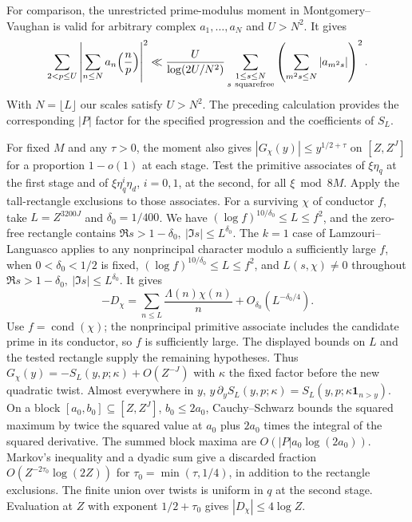 For comparison, the unrestricted prime-modulus moment in
Montgomery--Vaughan is valid for arbitrary complex
\(a_1,\ldots,a_N\) and \(U>N^2\). It gives
\[
 \sum_{2<p\le U}\left|\sum_{n\le N}a_n\Bigl(\frac np\Bigr)\right|^2
 \ll\frac{U}{\log(2U/N^2)}
      \sum_{\substack{1\le s\le N\\s\ {\rm squarefree}}}
     \left(\sum_{m^2s\le N}|a_{m^2s}|\right)^2.
\]
With \(N=\lfloor L\rfloor\) our scales satisfy \(U>N^2\).
The preceding calculation provides the corresponding \(|P|\)
factor for the specified progression and the coefficients of \(S_L\).
\cite[Lemma~9, (7), p.~480]{f1montgomery-vaughan-moments}

For fixed \(M\) and any \(\tau>0\), the moment also gives
\(|G_\chi(y)|\le y^{1/2+\tau}\) on \([Z,Z^J]\) for a proportion
\(1-o(1)\) at each stage. Test the primitive associates of
\(\xi\eta_q\) at the first stage and of \(\xi\eta_q^i\eta_d\),
\(i=0,1\), at the second, for all \(\xi\bmod 8M\).
Apply the tall-rectangle exclusions to those associates. For a
surviving \(\chi\) of conductor \(f\), take \(L=Z^{3200J}\) and
\(\delta_0=1/400\).
We have \((\log f)^{10/\delta_0}\le L\le f^2\), and the zero-free
rectangle contains \(\Re s>1-\delta_0,\ |\Im s|\le L^{\delta_0}\).
The \(k=1\) case of Lamzouri--Languasco applies to any nonprincipal
character modulo a sufficiently large \(f\), when \(0<\delta_0<1/2\)
is fixed, \((\log f)^{10/\delta_0}\le L\le f^2\), and
\(L(s,\chi)\ne0\) throughout
\(\Re s>1-\delta_0,\ |\Im s|\le L^{\delta_0}\). It gives
\[
 -D_\chi=\sum_{n\le L}\frac{\Lambda(n)\chi(n)}{n}
                 +O_{\delta_0}(L^{-\delta_0/4}).
\]
Use \(f=\operatorname{cond}(\chi)\); the nonprincipal primitive
associate includes the candidate prime in its conductor, so
\(f\) is sufficiently large. The displayed bounds on \(L\) and
the tested rectangle supply the remaining hypotheses.
\cite[arXiv v1, Proposition~3.2, p.~8]{f1lamzouri-languasco}
Thus \(G_\chi(y)=-S_L(y,p;\kappa)+O(Z^{-J})\) with \(\kappa\)
the fixed factor before the new quadratic twist. Almost everywhere
in \(y\), \(y\,\partial_y S_L(y,p;\kappa)=
S_L(y,p;\kappa\mathbf1_{n>y})\).
On a block \([a_0,b_0]\subseteq[Z,Z^J]\), \(b_0\le2a_0\),
Cauchy--Schwarz bounds the squared maximum by twice the squared
value at \(a_0\) plus \(2a_0\) times the integral of the squared
derivative. The summed block maxima are \(O(|P|a_0\log(2a_0))\).
Markov's inequality and a dyadic sum give a discarded fraction
\(O(Z^{-2\tau_0}\log(2Z))\) for \(\tau_0=\min(\tau,1/4)\),
in addition to the rectangle exclusions. The finite union over
twists is uniform in \(q\) at the second stage. Evaluation at
\(Z\) with exponent \(1/2+\tau_0\) gives \(|D_\chi|\le4\log Z\).


